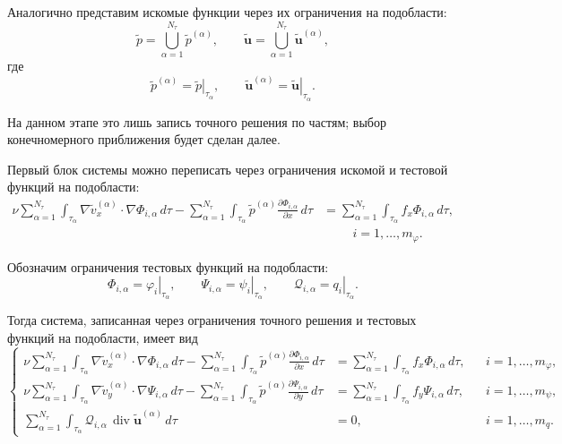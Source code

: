 \documentclass[a4paper,14pt]{extarticle}
\begin{document}
	
	Аналогично представим искомые функции через их ограничения на
	подобласти:
	\[
	\widetilde p
	=
	\bigcup_{\alpha=1}^{N_\tau}\widetilde p^{(\alpha)},
	\qquad
	\widetilde{\boldsymbol u}
	=
	\bigcup_{\alpha=1}^{N_\tau}
	\widetilde{\boldsymbol u}^{(\alpha)},
	\]
	где
	\[
	\widetilde p^{(\alpha)}
	=
	\left.\widetilde p\right|_{\tau_\alpha},
	\qquad
	\widetilde{\boldsymbol u}^{(\alpha)}
	=
	\left.\widetilde{\boldsymbol u}\right|_{\tau_\alpha}.
	\]
	
	На данном этапе это лишь запись точного решения по частям; выбор
	конечномерного приближения будет сделан далее.
	
	Первый блок системы можно переписать через ограничения искомой и
	тестовой функций на подобласти:
	\[
	\begin{aligned}
		\nu\sum_{\alpha=1}^{N_\tau}
		\int_{\tau_\alpha}
		\nabla\widetilde v_x^{(\alpha)}
		\cdot\nabla\Phi_{i,\alpha}\,d\tau
		-
		\sum_{\alpha=1}^{N_\tau}
		\int_{\tau_\alpha}
		\widetilde p^{(\alpha)}
		\frac{\partial\Phi_{i,\alpha}}{\partial x}\,d\tau
		&=
		\sum_{\alpha=1}^{N_\tau}
		\int_{\tau_\alpha}
		f_x\Phi_{i,\alpha}\,d\tau,
		\\
		&\hspace{1cm} i=1,\ldots,m_\varphi.
	\end{aligned}
	\]
	
	Обозначим ограничения тестовых функций на подобласти:
	\[
	\Phi_{i,\alpha}
	=
	\left.\varphi_i\right|_{\tau_\alpha},
	\qquad
	\Psi_{i,\alpha}
	=
	\left.\psi_i\right|_{\tau_\alpha},
	\qquad
	\mathcal Q_{i,\alpha}
	=
	\left.q_i\right|_{\tau_\alpha}.
	\]
	
	Тогда система, записанная через ограничения точного решения и
	тестовых функций на подобласти, имеет вид
	\[
	\left\{
	\begin{aligned}
		\nu\sum_{\alpha=1}^{N_\tau}
		\int_{\tau_\alpha}
		\nabla\widetilde v_x^{(\alpha)}
		\cdot\nabla\Phi_{i,\alpha}\,d\tau
		-
		\sum_{\alpha=1}^{N_\tau}
		\int_{\tau_\alpha}
		\widetilde p^{(\alpha)}
		\frac{\partial\Phi_{i,\alpha}}{\partial x}\,d\tau
		&=
		\sum_{\alpha=1}^{N_\tau}
		\int_{\tau_\alpha}
		f_x\Phi_{i,\alpha}\,d\tau,
		&&i=1,\ldots,m_\varphi,
		\\[2mm]
		\nu\sum_{\alpha=1}^{N_\tau}
		\int_{\tau_\alpha}
		\nabla\widetilde v_y^{(\alpha)}
		\cdot\nabla\Psi_{i,\alpha}\,d\tau
		-
		\sum_{\alpha=1}^{N_\tau}
		\int_{\tau_\alpha}
		\widetilde p^{(\alpha)}
		\frac{\partial\Psi_{i,\alpha}}{\partial y}\,d\tau
		&=
		\sum_{\alpha=1}^{N_\tau}
		\int_{\tau_\alpha}
		f_y\Psi_{i,\alpha}\,d\tau,
		&&i=1,\ldots,m_\psi,
		\\[2mm]
		\sum_{\alpha=1}^{N_\tau}
		\int_{\tau_\alpha}
		\mathcal Q_{i,\alpha}\,
		\operatorname{div}
		\widetilde{\boldsymbol u}^{(\alpha)}\,d\tau
		&=0,
		&&i=1,\ldots,m_q.
	\end{aligned}
	\right.
	\]
	
\end{document}
